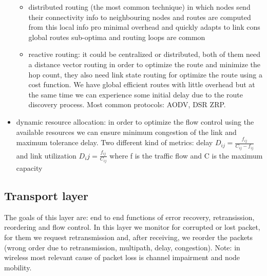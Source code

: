 \begin{itemize}
\begin{itemize}
		\item distributed routing (the most common technique) in which nodes send their connectivity info to neighbouring nodes and routes are computed from this local info pro minimal overhead and quickly adapts to link cons global routes sub-optima and routing loops are common
		\item reactive routing:	it could be centralized or distributed, both of them need a distance vector routing in order to optimize the route and minimize the hop count, they also need link state routing  for optimize the route using a cost function. We have global efficient routes with little overhead but at the same time we can experience some initial delay due to the route discovery process. Most common protocols: AODV, DSR ZRP.
	\end{itemize}
	\item dynamic resource allocation: in order to optimize the flow control using the available resources we can ensure minimum congestion of the link and maximum tolerance delay. Two different kind of metrics: delay $ D_{ij}=\frac{f_{ij}}{C_{ij}-f_{ij}} $ and link utilization $ D_ij=\frac{f_{ij}}{C_{ij}} $ where f is the traffic flow and C is the maximum capacity	
\end{itemize}

\subsection{Transport layer}
The goals of this layer are: end to end functions of error recovery, retransission, reordering and flow control. In this layer we monitor for corrupted or lost packet, for them we request retransmission and, after receiving, we reorder the packets (wrong order due to retransmission, multipath, delay, congestion). Note: in wireless most relevant cause of packet loss is channel impairment and node mobility.


